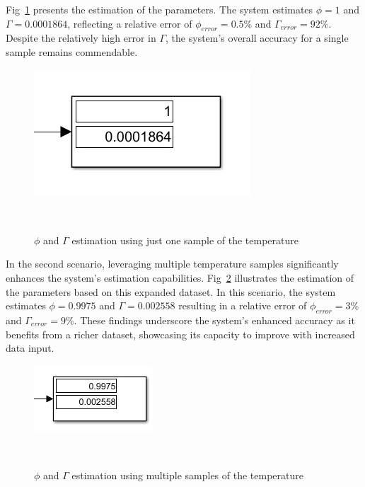 Fig~\ref{fig:simulink_params} presents the estimation of the parameters. The system estimates $\phi = 1$ and $\Gamma = 0.0001864$, reflecting a relative error of $\phi_{error} = 0.5\%$ and $\Gamma_{error} = 92\%$. Despite the relatively high error in $\Gamma$, the system's overall accuracy for a single sample remains commendable.

\begin{figure}[H]
\centering
\includegraphics[width=0.55\linewidth]{figures/simulink_params.png}
\caption{$\phi$ and $\Gamma$ estimation using just one sample of the temperature}
~\label{fig:simulink_params}
\end{figure}

In the second scenario, leveraging multiple temperature samples significantly enhances the system's estimation capabilities. Fig~\ref{fig:simulink_params_gen} illustrates the estimation of the parameters based on this expanded dataset. In this scenario, the system estimates $\phi = 0.9975$ and $\Gamma = 0.002558$ resulting in a relative error of $\phi_{error} = 3\%$ and $\Gamma_{error} = 9\%$. These findings underscore the system's enhanced accuracy as it benefits from a richer dataset, showcasing its capacity to improve with increased data input.

\begin{figure}[H]
\centering
\includegraphics[width=0.4\linewidth]{figures/simulink_params_gen.png}
\caption{$\phi$ and $\Gamma$ estimation using multiple samples of the temperature}
~\label{fig:simulink_params_gen}
\end{figure}

